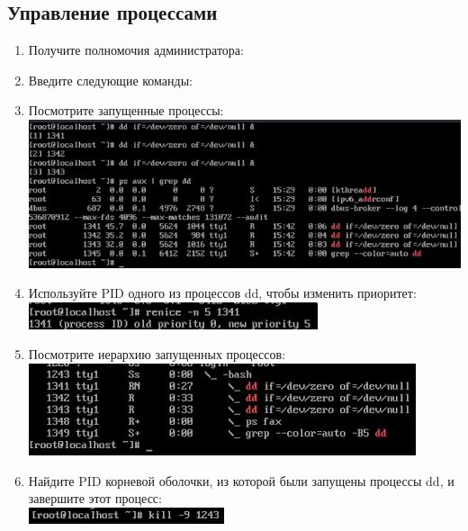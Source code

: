 \documentclass[12pt]{article}
\begin{document}
\subsection{Управление процессами}
\begin{enumerate}
	\item Получите полномочия администратора:
	\item Введите следующие команды:
	\item Посмотрите запущенные процессы: \\
	      \includegraphics{11.png}
	\item Используйте PID одного из процессов dd, чтобы изменить приоритет: \\
	      \includegraphics{12.png}
	\item Посмотрите иерархию запущенных процессов: \\
	      \includegraphics{13.png}
	\item Найдите PID корневой оболочки, из которой были запущены процессы dd, и завершите этот процесс: \\
	      \includegraphics{14.png}
\end{enumerate}
\end{document}

